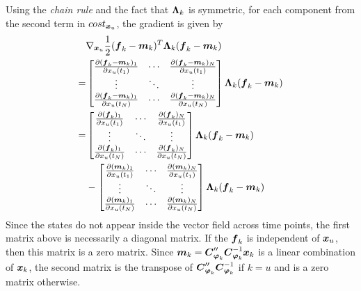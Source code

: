 Using the \emph{chain rule} and the fact that $\boldsymbol{\Lambda}_{k}$ is symmetric, for each component from the second term in $cost_{\boldsymbol{x}_{u}}$, the gradient is given by
\begin{align}
    &\nabla_{\boldsymbol{x}_{u}}\frac{1}{2}(\boldsymbol{f}_{k}-\boldsymbol{m}_{k})^T\boldsymbol{\Lambda}_{k}(\boldsymbol{f}_{k}-\boldsymbol{m}_{k})
    \nonumber
    \\
    = & 
    \begin{bmatrix}
        \frac{\partial(\boldsymbol{f}_{k}-\boldsymbol{m}_{k})_1}{\partial x_{u}(t_{1})} 
        & 
        \cdots 
        & 
        \frac{\partial(\boldsymbol{f}_{k}-\boldsymbol{m}_{k})_N}{\partial x_{u}(t_{1})}
        \\
        \vdots 
        &
        \ddots
        &
        \vdots
        \\
        \frac{\partial(\boldsymbol{f}_{k}-\boldsymbol{m}_{k})_1}{\partial x_{u}(t_{N})} 
        &
        \cdots
        &
        \frac{\partial(\boldsymbol{f}_{k}-\boldsymbol{m}_{k})_N}{\partial x_{u}(t_{N})} 
    \end{bmatrix}
    \boldsymbol{\Lambda}_{k}
    (\boldsymbol{f}_{k}-\boldsymbol{m}_{k})
    \nonumber
    \\
    = &
    \begin{bmatrix}
        \frac{\partial(\boldsymbol{f}_{k})_1}{\partial x_{u}(t_{1})} 
        & 
        \cdots 
        & 
        \frac{\partial(\boldsymbol{f}_{k})_N}{\partial x_{u}(t_{1})}
        \\
        \vdots 
        &
        \ddots
        &
        \vdots
        \\
        \frac{\partial(\boldsymbol{f}_{k})_1}{\partial x_{u}(t_{N})} 
        &
        \cdots
        &
        \frac{\partial(\boldsymbol{f}_{k})_N}{\partial x_{u}(t_{N})} 
    \end{bmatrix}
    \boldsymbol{\Lambda}_{k}(\boldsymbol{f}_{k}-\boldsymbol{m}_{k}) 
    \nonumber
    \\
    & -
    \begin{bmatrix}
        \frac{\partial(\boldsymbol{m}_{k})_1}{\partial x_{u}(t_{1})} 
        & 
        \cdots 
        & 
        \frac{\partial(\boldsymbol{m}_{k})_N}{\partial x_{u}(t_{1})}
        \\
        \vdots 
        &
        \ddots
        &
        \vdots
        \\
        \frac{\partial(\boldsymbol{m}_{k})_1}{\partial x_{u}(t_{N})} 
        &
        \cdots
        &
        \frac{\partial(\boldsymbol{m}_{k})_N}{\partial x_{u}(t_{N})} 
    \end{bmatrix}
    \boldsymbol{\Lambda}_{k}(\boldsymbol{f}_{k}-\boldsymbol{m}_{k})  
\end{align}
Since the states do not appear inside the vector field across time points, the first matrix above is necessarily a diagonal matrix.
If the $\boldsymbol{f}_{k}$ is independent of $\boldsymbol{x}_{u}$, then this matrix is a zero matrix.
Since $\boldsymbol{m}_{k} = \boldsymbol{C}^{\prime\prime}_{\boldsymbol{\varphi}_{k}}\boldsymbol{C}_{\boldsymbol{\varphi}_{k}}^{-1}\boldsymbol{x}_{k}$ is a linear combination of $\boldsymbol{x}_{k}$, the second matrix is the transpose of $\boldsymbol{C}^{\prime\prime}_{\boldsymbol{\varphi}_{k}}\boldsymbol{C}_{\boldsymbol{\varphi}_{k}}^{-1}$ if $k = u$ and is a zero matrix otherwise.

